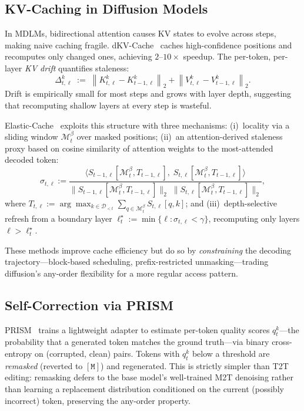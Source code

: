 \documentclass[11pt]{article}
\newcommand{\cM}{\mathcal{M}}
\newcommand{\cD}{\mathcal{D}}
\newcommand{\mask}{\ensuremath{\mathtt{[M]}}}
\begin{document}
\subsection{KV-Caching in Diffusion Models}
\label{sec:bg_dkv}

In MDLMs, bidirectional attention causes KV states to evolve across steps, making naive caching fragile.
dKV-Cache~\cite{ma2025dkv} caches high-confidence positions and recomputes only changed ones, achieving $2$--$10\times$ speedup.
The per-token, per-layer \emph{KV drift} quantifies staleness:
\begin{equation}
    \Delta^{k}_{t,\ell}
    \;:=\;
    \left\lVert K^{k}_{t,\ell} - K^{k}_{t-1,\ell} \right\rVert_2
    +
    \left\lVert V^{k}_{t,\ell} - V^{k}_{t-1,\ell} \right\rVert_2.
    \label{eq:kv_drift}
\end{equation}
Drift is empirically small for most steps and grows with layer depth, suggesting that recomputing shallow layers at every step is wasteful.

Elastic-Cache~\cite{elastic_cache} exploits this structure with three mechanisms: (i)~locality via a sliding window $\cM_t^\beta$ over masked positions; (ii)~an attention-derived staleness proxy based on cosine similarity of attention weights to the most-attended decoded token:
\begin{equation}
    \sigma_{t,\ell}
    :=
    \frac{
      \langle S_{t-1,\ell}[\cM_t^\beta, T_{t-1,\ell}],\; S_{t,\ell}[\cM_t^\beta, T_{t-1,\ell}] \rangle
    }{
      \| S_{t-1,\ell}[\cM_t^\beta, T_{t-1,\ell}] \|_2 \;
      \| S_{t,\ell}[\cM_t^\beta, T_{t-1,\ell}] \|_2
    },
    \label{eq:attn_cosine}
\end{equation}
where $T_{t,\ell} := \arg\max_{k \in \cD_{<t}} \sum_{q \in \cM_t^\beta} S_{t,\ell}[q,k]$; and (iii)~depth-selective refresh from a boundary layer $\ell_t^\star := \min\{\ell : \sigma_{t,\ell} < \gamma\}$, recomputing only layers $\ell > \ell_t^\star$.

These methods improve cache efficiency but do so by \emph{constraining} the decoding trajectory---block-based scheduling, prefix-restricted unmasking---trading diffusion's any-order flexibility for a more regular access pattern.

\subsection{Self-Correction via PRISM}
\label{sec:bg_prism}

PRISM~\cite{kim2025prism} trains a lightweight adapter to estimate per-token quality scores $q_t^k$---the probability that a generated token matches the ground truth---via binary cross-entropy on (corrupted, clean) pairs.
Tokens with $q_t^k$ below a threshold are \emph{remasked} (reverted to $\mask$) and regenerated.
This is strictly simpler than T2T editing: remasking defers to the base model's well-trained M2T denoising rather than learning a replacement distribution conditioned on the current (possibly incorrect) token, preserving the any-order property.
\end{document}
